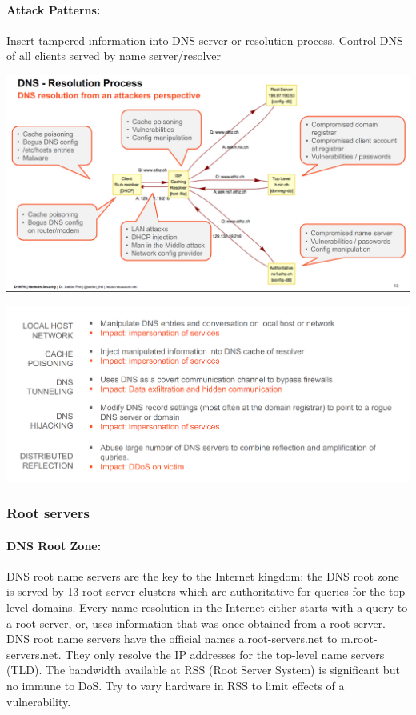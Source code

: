 \paragraph{Attack Patterns:}
Insert tampered information into DNS server or resolution process. Control DNS of all clients served by name server/resolver

\begin{minipage}{\linewidth}
    \centering      
    \includegraphics[width=\linewidth]{Figures/DNS_attacker_perspective.PNG} 
\end{minipage}

\begin{minipage}{\linewidth}
    \centering      
    \includegraphics[width=\linewidth]{Figures/DNS_common_attacks.PNG} 
\end{minipage}

\subsubsection{Root servers}

\paragraph{DNS Root Zone:}
DNS root name servers are the key to the Internet kingdom: the DNS root zone is served by 13 root server clusters which are authoritative for queries for the top level domains. Every name resolution in the Internet either starts with a query to a root server, or, uses information that was once obtained from a root server. DNS root name servers have the official names a.root-servers.net to m.root-servers.net. They only resolve the IP addresses for the top-level name servers (TLD). The bandwidth available at RSS (Root Server System) is significant but no immune to DoS. Try to vary hardware in RSS to limit effects of a vulnerability.

